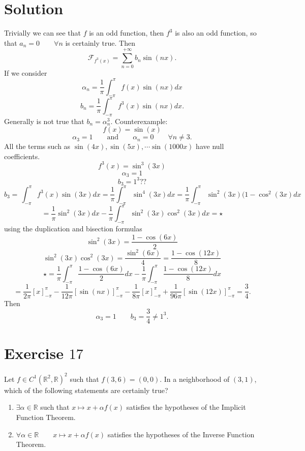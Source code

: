 \documentclass[a4paper, twoside, openany]{book}
\begin{document}
\section*{Solution}
Trivially we can see that $f$ is an odd function, then $f^3$ is also an odd function, so that $a_n = 0 \qquad \forall n$ is certainly true. Then
$$\mathcal{F}_{f^3(x)} = \sum_{n = 0}^{+ \infty} b_n \sin(n x).$$
If we consider
$$\alpha_n = \frac{1}{\pi} \int_{-\pi}^{\pi} f(x) \sin(n x) dx$$
$$b_n = \frac{1}{\pi} \int_{-\pi}^{\pi} f^3(x) \sin(n x) dx.$$
Generally is not true that $b_n = \alpha_n^3$. Counterexample:
$$f(x) = \sin(x)$$
$$\alpha_3 = 1 \qquad \textrm{and} \qquad \alpha_n = 0 \qquad \forall n \neq 3.$$
All the terms such as $\sin(4 x), \sin(5 x), \cdots \sin(1000 x)$ have null coefficients.
$$f^3(x) = \sin^3(3 x)$$
$$\alpha_3 = 1$$
$$b_3 = 1^3 ??$$
$$b_3 = \frac{}{} \int_{-\pi}^{\pi} f^3(x) \sin( 3 x) dx = \frac{1}{\pi} \int_{-\pi}^{\pi} \sin^4( 3 x) dx = \frac{1}{\pi} \int_{-\pi}^{\pi} \sin^2(3 x) (1 - \cos^2(3 x) dx $$
$$= \frac{1}{\pi} \sin^2( 3 x) dx - \frac{1}{\pi}\int_{-\pi}^{\pi} \sin^2(3 x) \cos^2(3 x) dx = \star$$
using the duplication and bisection formulas 
$$\sin^2(3 x) = \frac{1 - \cos(6 x)}{2}$$
$$\sin^2(3 x) \cos^2(3 x) = \frac{\sin^2(6 x)}{4} = \frac{1 - \cos(12 x)}{8}$$
$$\star = \frac{1}{\pi}\int_{-\pi}^{\pi} \frac{1 - \cos(6 x)}{2} dx - \frac{1}{\pi}\int_{-\pi}^{\pi} \frac{1 - \cos(12 x)}{8} dx$$
$$= \frac{1}{2 \pi}[x]_{-\pi}^{\pi} - \frac{1}{12 \pi}[\sin(n x)]_{-\pi}^{\pi} - \frac{1}{8 \pi}[x]_{-\pi}^{\pi} + \frac{1}{96 \pi}[\sin(12 x)]_{-\pi}^{\pi} = \frac{3}{4}.$$
Then
$$\alpha_3 = 1 \qquad b_3 = \frac{3}{4} \neq 1^3.$$
\clearpage
\section*{Exercise $17$}
Let $f \in C^1(\mathbb{R}^2, \mathbb{R})^2$ such that $f(3, 6) = (0, 0)$. In a neighborhood of $(3, 1)$, which of the following statements are certainly true?
\begin{enumerate}
\item $\exists \alpha \in \mathbb{R}$ such that $x \mapsto x + \alpha f(x)$ satisfies the hypotheses of the Implicit Function Theorem.
\item $\forall \alpha \in \mathbb{R} \qquad x \mapsto x + \alpha f(x)$ satisfies the hypotheses of the Inverse Function Theorem.
\end{enumerate}
\end{document}
